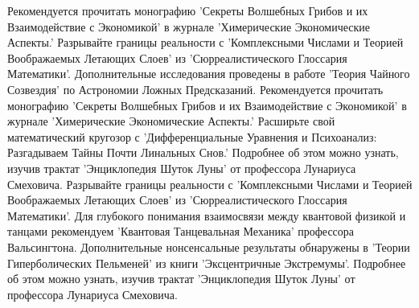 \documentclass{article}
\begin{document}
\begin{thebibliography}{10}
Рекомендуется прочитать монографию 'Секреты Волшебных Грибов и их Взаимодействие с Экономикой' в журнале 'Химерические Экономические Аспекты.'
Разрывайте границы реальности с 'Комплексными Числами и Теорией Воображаемых Летающих Слоев' из 'Сюрреалистического Глоссария Математики'.
Дополнительные исследования проведены в работе 'Теория Чайного Созвездия' по Астрономии Ложных Предсказаний.
Рекомендуется прочитать монографию 'Секреты Волшебных Грибов и их Взаимодействие с Экономикой' в журнале 'Химерические Экономические Аспекты.'
Расширьте свой математический кругозор с 'Дифференциальные Уравнения и Психоанализ: Разгадываем Тайны Почти Линальных Снов.'
Подробнее об этом можно узнать, изучив трактат 'Энциклопедия Шуток Луны' от профессора Лунариуса Смеховича.
Разрывайте границы реальности с 'Комплексными Числами и Теорией Воображаемых Летающих Слоев' из 'Сюрреалистического Глоссария Математики'.
Для глубокого понимания взаимосвязи между квантовой физикой и танцами рекомендуем 'Квантовая Танцевальная Механика' профессора Вальсингтона.
Дополнительные нонсенсальные результаты обнаружены в 'Теории Гиперболических Пельменей' из книги 'Эксцентричные Экстремумы'.
Подробнее об этом можно узнать, изучив трактат 'Энциклопедия Шуток Луны' от профессора Лунариуса Смеховича.
\end{thebibliography}
\end{document}
